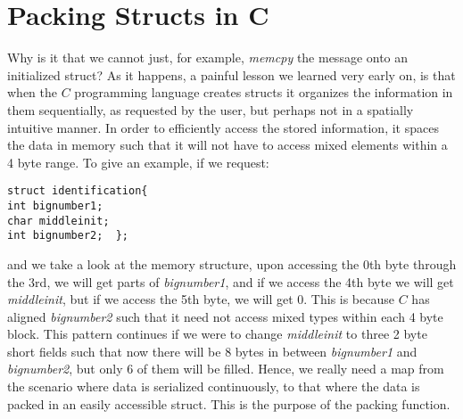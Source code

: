 \chapter{Packing Structs in C}
\label{structpack}
Why is it that we cannot just, for example, \textit{memcpy} the message onto an initialized struct? As it happens, a painful lesson we learned very early on, is that when the $C$ programming language creates structs it organizes the information in them sequentially, as requested by the user, but perhaps not in a spatially intuitive manner. In order to efficiently access the stored information, it spaces the data in memory such that it will not have to access mixed elements within a 4 byte range. To give an example, if we request:
\begin{verbatim}
struct identification{
int bignumber1;
char middleinit;
int bignumber2;  };
\end{verbatim}
and we take a look at the memory structure, upon accessing the 0th byte through the 3rd, we will get parts of \textit{bignumber1}, and if we access the 4th byte we will get \textit{middleinit}, but if we access the 5th byte, we will get 0. This is because $C$ has aligned \textit{bignumber2} such that it need not access mixed types within each 4 byte block. This pattern continues if we were to change \textit{middleinit} to three 2 byte short fields such that now there will be 8 bytes in between \textit{bignumber1} and \textit{bignumber2}, but only 6 of them will be filled. Hence, we really need a map from the scenario where data is serialized continuously, to that where the data is packed in an easily accessible struct. This is the purpose of the packing function.